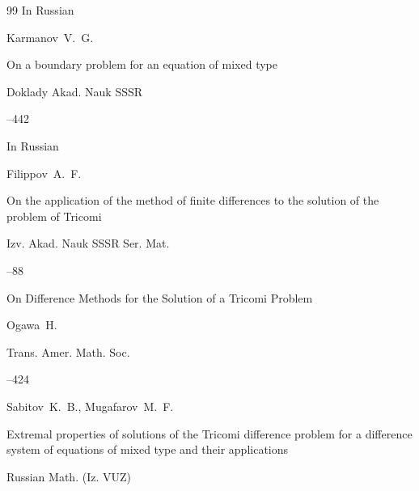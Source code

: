 \begin{thebibliography}{99}
\lang In Russian

\by Karmanov~V.~G.

\paper On a boundary problem for an equation of mixed type

\jour Doklady Akad. Nauk SSSR 




--442






\lang In Russian

\by Filippov~A.~F.

\paper On the application of the method of finite differences to the solution of the problem of Tricomi

\jour Izv. Akad. Nauk SSSR Ser. Mat.




--88






\paper On Difference Methods for the Solution of a Tricomi Problem 

\by Ogawa~H.

\jour Trans. Amer. Math. Soc.




--424





\by Sabitov~K.~B., Mugafarov~M.~F.

\paper Extremal properties of solutions of the Tricomi difference problem for a difference system of equations of mixed type and their applications



\jour Russian Math. (Iz. VUZ)





\end{thebibliography}

